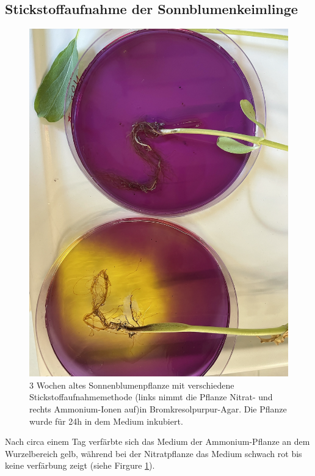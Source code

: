 \documentclass[10pt,a4paper]{article}
\begin{document}
		
		\subsection{Stickstoffaufnahme der Sonnblumenkeimlinge}
		
			\begin{figure}[H]
				\centering
				\includegraphics[angle = 90, scale=0.3]{Stickstoffaufnahme.png}
				\caption{3 Wochen altes Sonnenblumenpflanze mit verschiedene Stickstoffaufnahmemethode (links nimmt die Pflanze Nitrat- und rechts Ammonium-Ionen auf)in Bromkresolpurpur-Agar. Die Pflanze wurde für 24h in dem Medium inkubiert.}
				\label{fig:stickstoffaufnahme}
			\end{figure}
			
		Nach circa einem Tag verfärbte sich das Medium der Ammonium-Pflanze an dem Wurzelbereich gelb, während bei der Nitratpflanze das Medium schwach rot bis keine verfärbung zeigt (siehe Firgure \ref{fig:stickstoffaufnahme}).
	
\end{document}
